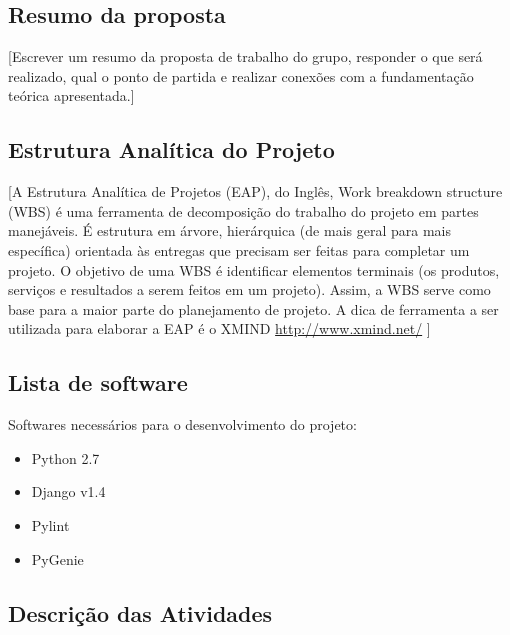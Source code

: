 



\subsection{Resumo da proposta} %
\label{sub:resumo_da_proposta}

[Escrever um resumo da proposta de trabalho do grupo, responder o que será realizado, qual o ponto de partida e realizar conexões com a fundamentação teórica apresentada.]

\subsection{Estrutura Analítica do Projeto} %
\label{sub:estrutura_anal_tica_do_projeto}

[A Estrutura Analítica de Projetos (EAP), do Inglês, Work breakdown structure (WBS) é uma ferramenta de decomposição do trabalho do projeto em partes manejáveis. É estrutura em árvore, hierárquica (de mais geral para mais específica) orientada às entregas que precisam ser feitas para completar um projeto.
O objetivo de uma WBS é identificar elementos terminais (os produtos, serviços e resultados a serem feitos em um projeto). Assim, a WBS serve como base para a maior parte do planejamento de projeto.
A dica de ferramenta a ser utilizada para elaborar a EAP é o XMIND 
\url{http://www.xmind.net/} ]


\subsection{Lista de software} %
\label{sub:lista_de_software}

Softwares necessários para o desenvolvimento do projeto:
\begin{itemize}
	\item Python 2.7
	\item Django v1.4
	\item Pylint
	\item PyGenie
\end{itemize}


\subsection{Descrição das Atividades} %
\label{sub:descri_o_das_atividades}

